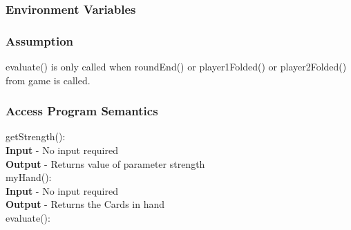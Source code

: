 \documentclass[11pt]{article}
\begin{document}
    \subsubsection{Environment Variables}
    \subsubsection{Assumption}
    evaluate() is only called when roundEnd() or player1Folded() or player2Folded() from game is called.
    \subsubsection{Access Program Semantics}
    getStrength():\\
    \textbf{Input} - No input required\\
    \textbf{Output} - Returns value of parameter strength\\
    myHand():\\
    \textbf{Input} - No input required\\
    \textbf{Output} - Returns the Cards in hand\\
    evaluate():\\
 	
\end{document}
